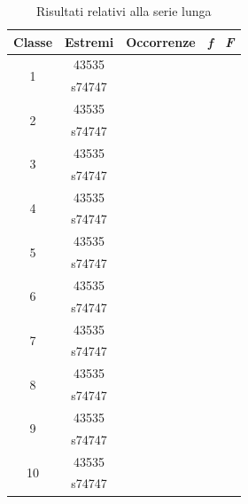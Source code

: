 \begin{table}[H]
	\centering
	\begin{tabular}{c|c|c|c|c}
		\toprule
		\toprule
		\textbf{Classe}&\textbf{Estremi} &\textbf{Occorrenze}&\textbf{\textit{f}}&\textbf{\textit{F}}\\
		\midrule
		\midrule
		\multirow{2}{*}{1}&43535&\multirow{2}{*}{}&\multirow{2}{*}{}&\multirow{2}{*}{} \\
		&s74747&&&\\
		\midrule
		\multirow{2}{*}{2}&43535&\multirow{2}{*}{}&\multirow{2}{*}{}&\multirow{2}{*}{} \\
		&s74747&&&\\
		\midrule
		\multirow{2}{*}{3}&43535&\multirow{2}{*}{}&\multirow{2}{*}{}&\multirow{2}{*}{} \\
		&s74747&&&\\
		\midrule
		\multirow{2}{*}{4}&43535&\multirow{2}{*}{}&\multirow{2}{*}{}&\multirow{2}{*}{} \\
		&s74747&&&\\
		\midrule
		\multirow{2}{*}{5}&43535&\multirow{2}{*}{}&\multirow{2}{*}{}&\multirow{2}{*}{} \\
		&s74747&&&\\
		\midrule
		\multirow{2}{*}{6}&43535&\multirow{2}{*}{}&\multirow{2}{*}{}&\multirow{2}{*}{} \\
		&s74747&&&\\
		\midrule
		\multirow{2}{*}{7}&43535&\multirow{2}{*}{}&\multirow{2}{*}{}&\multirow{2}{*}{} \\
		&s74747&&&\\
		\midrule
		\multirow{2}{*}{8}&43535&\multirow{2}{*}{}&\multirow{2}{*}{}&\multirow{2}{*}{} \\
		&s74747&&&\\
		\midrule
		\multirow{2}{*}{9}&43535&\multirow{2}{*}{}&\multirow{2}{*}{}&\multirow{2}{*}{} \\
		&s74747&&&\\
		\midrule
		\multirow{2}{*}{10}&43535&\multirow{2}{*}{}&\multirow{2}{*}{}&\multirow{2}{*}{} \\
		&s74747&&&\\
		\midrule
		\bottomrule
		\bottomrule
	\end{tabular}
	\caption{Risultati relativi alla serie lunga}
	\label{tab:serielunga}
\end{table} 


